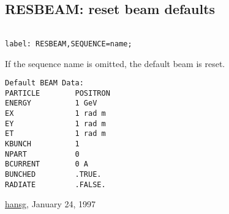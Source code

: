 




\subsection{RESBEAM: reset beam defaults}
\begin{verbatim}

label: RESBEAM,SEQUENCE=name;
\end{verbatim} If the sequence name is omitted, the default beam is reset. 
\begin{verbatim}
Default BEAM Data:
PARTICLE        POSITRON
ENERGY          1 GeV
EX              1 rad m
EY              1 rad m
ET              1 rad m
KBUNCH          1
NPART           0
BCURRENT        0 A
BUNCHED         .TRUE.
RADIATE         .FALSE.
\end{verbatim}

\href{http://www.cern.ch/Hans.Grote/hansg_sign.html}{hansg}, January 24, 1997 

